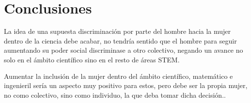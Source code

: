 \section{Conclusiones}
\label{sec:conclusiones}

La idea de una supuesta discriminación por parte del hombre hacia la mujer dentro de la ciencia debe acabar, no tendría 
sentido que el hombre para seguir aumentando su poder social discriminase a otro colectivo, negando un avance no solo 
en el ámbito científico sino en el resto de áreas STEM. 

Aumentar la inclusión de la mujer dentro del ámbito científico, matemático e ingenieril sería un aspecto muy positivo para 
estos, pero debe ser la propia mujer, no como colectivo, sino como individuo, la que deba tomar dicha decisión.\nocite{maldita}.

          


